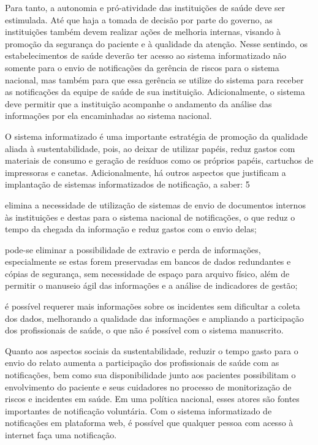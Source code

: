 \documentclass{article}
\begin{document}
Para tanto, a autonomia e pró-atividade das instituições de saúde deve ser estimulada. Até
        que haja a tomada de decisão por parte do governo, as instituições também devem realizar
        ações de melhoria internas, visando à promoção da segurança do paciente e à qualidade da
        atenção. Nesse sentindo, os estabelecimentos de saúde deverão ter acesso ao sistema
        informatizado não somente para o envio de notificações da gerência de riscos para o sistema
        nacional, mas também para que essa gerência se utilize do sistema para receber as
        notificações da equipe de saúde de sua instituição. Adicionalmente, o sistema deve permitir
        que a instituição acompanhe o andamento da análise das informações por ela encaminhadas ao
        sistema nacional.

O sistema informatizado é uma importante estratégia de promoção da qualidade aliada à
        sustentabilidade, pois, ao deixar de utilizar papéis, reduz gastos com materiais de consumo
        e geração de resíduos como os próprios papéis, cartuchos de impressoras e canetas.
        Adicionalmente, há outros aspectos que justificam a implantação de sistemas informatizados
        de notificação, a saber: %
5%


elimina a necessidade de utilização de sistemas de envio de documentos internos às
            instituições e destas para o sistema nacional de notificações, o que reduz o tempo da
            chegada da informação e reduz gastos com o envio delas;

pode-se eliminar a possibilidade de extravio e perda de informações, especialmente se
            estas forem preservadas em bancos de dados redundantes e cópias de segurança, sem
            necessidade de espaço para arquivo físico, além de permitir o manuseio ágil das
            informações e a análise de indicadores de gestão;

é possível requerer mais informações sobre os incidentes sem dificultar a coleta dos
            dados, melhorando a qualidade das informações e ampliando a participação dos
            profissionais de saúde, o que não é possível com o sistema manuscrito.

Quanto aos aspectos sociais da sustentabilidade, reduzir o tempo gasto para o envio do
        relato aumenta a participação dos profissionais de saúde com as notificações, bem como sua
        disponibilidade junto aos pacientes possibilitam o envolvimento do paciente e seus
        cuidadores no processo de monitorização de riscos e incidentes em saúde. Em uma política
        nacional, esses atores são fontes importantes de notificação voluntária. Com o sistema
        informatizado de notificações em plataforma web, é possível que qualquer pessoa com acesso à
        internet faça uma notificação.
\end{document}
